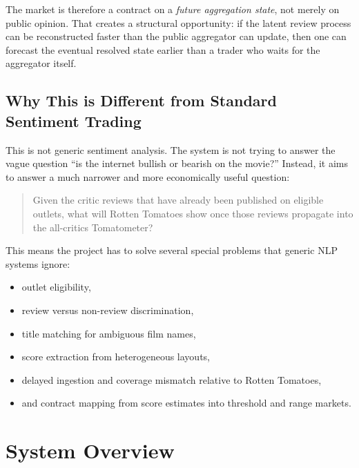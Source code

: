 \documentclass[11pt]{article}
\begin{document}
The market is therefore a contract on a \emph{future aggregation state}, not merely on public opinion. That creates a structural opportunity: if the latent review process can be reconstructed faster than the public aggregator can update, then one can forecast the eventual resolved state earlier than a trader who waits for the aggregator itself.

\subsection{Why This is Different from Standard Sentiment Trading}
This is not generic sentiment analysis. The system is not trying to answer the vague question ``is the internet bullish or bearish on the movie?'' Instead, it aims to answer a much narrower and more economically useful question:
\begin{quote}
Given the critic reviews that have already been published on eligible outlets, what will Rotten Tomatoes show once those reviews propagate into the all-critics Tomatometer?
\end{quote}

This means the project has to solve several special problems that generic NLP systems ignore:
\begin{itemize}[leftmargin=1.5em]
    \item outlet eligibility,
    \item review versus non-review discrimination,
    \item title matching for ambiguous film names,
    \item score extraction from heterogeneous layouts,
    \item delayed ingestion and coverage mismatch relative to Rotten Tomatoes,
    \item and contract mapping from score estimates into threshold and range markets.
\end{itemize}

\section{System Overview}
\end{document}
